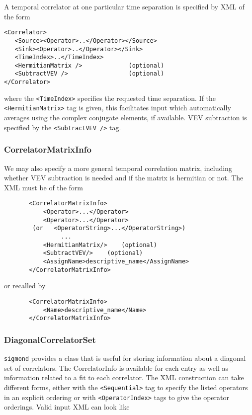 \documentclass[12pt]{article}
\newcommand{\sigmond}{\texttt{sigmond} }
\newcommand{\vb}{\texttt}
\begin{document}
A temporal correlator at one particular time separation is specified
by XML of the form
\begin{verbatim}
<Correlator>
   <Source><Operator>..</Operator></Source>
   <Sink><Operator>..</Operator></Sink>
   <TimeIndex>..</TimeIndex>
   <HermitianMatrix />             (optional)
   <SubtractVEV />                 (optional)
</Correlator>
\end{verbatim}
where the \vb{<TimeIndex>} specifies the requested time separation.
If the \vb{<HermitianMatrix>} tag is given, this facilitates
input which automatically averages using the complex conjugate
elements, if available.  VEV subtraction is specified by the
\vb{<SubtractVEV />} tag.

\subsubsection{CorrelatorMatrixInfo}
We may also specify a more general temporal correlation matrix,
including whether VEV subtraction is needed and if the matrix is
hermitian or not. The XML must be of the form
\begin{verbatim}
       <CorrelatorMatrixInfo>                                    
           <Operator>...</Operator>                              
           <Operator>...</Operator>                              
        (or   <OperatorString>...</OperatorString>)                
                ...                                              
           <HermitianMatrix/>    (optional)                      
           <SubtractVEV/>    (optional)                          
           <AssignName>descriptive_name</AssignName>             
       </CorrelatorMatrixInfo>                                   
\end{verbatim}                                                                 
or recalled by                                                         
\begin{verbatim}                                                                 
       <CorrelatorMatrixInfo>                                    
           <Name>descriptive_name</Name>                         
       </CorrelatorMatrixInfo>                                   
\end{verbatim}

\subsubsection{DiagonalCorrelatorSet} \label{sec:diag_corr_set}
\sigmond provides a class that is useful for storing information
about a diagonal set of correlators. The CorrelatorInfo is
available for each entry as well as information related to a fit
to each correlator. The XML construction can take different forms,
either with the \vb{<Sequential>} tag to specify the listed
operators in an explicit ordering or with \vb{<OperatorIndex>}
tags to give the operator orderings. Valid input XML can look like
\end{document}
